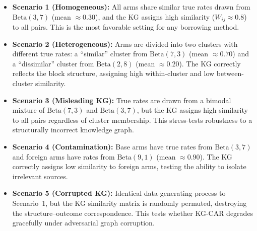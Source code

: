 \documentclass[12pt]{article}
\begin{document}
\begin{itemize}
\item \textbf{Scenario 1 (Homogeneous):} All arms share similar true rates drawn from $\text{Beta}(3, 7)$ (mean $\approx 0.30$), and the KG assigns high similarity ($W_{ij} \approx 0.8$) to all pairs. This is the most favorable setting for any borrowing method.

\item \textbf{Scenario 2 (Heterogeneous):} Arms are divided into two clusters with different true rates: a ``similar'' cluster from $\text{Beta}(7, 3)$ (mean $\approx 0.70$) and a ``dissimilar'' cluster from $\text{Beta}(2, 8)$ (mean $\approx 0.20$). The KG correctly reflects the block structure, assigning high within-cluster and low between-cluster similarity.

\item \textbf{Scenario 3 (Misleading KG):} True rates are drawn from a bimodal mixture of $\text{Beta}(7, 3)$ and $\text{Beta}(3, 7)$, but the KG assigns high similarity to all pairs regardless of cluster membership. This stress-tests robustness to a structurally incorrect knowledge graph.

\item \textbf{Scenario 4 (Contamination):} Base arms have true rates from $\text{Beta}(3, 7)$ and foreign arms have rates from $\text{Beta}(9, 1)$ (mean $\approx 0.90$). The KG correctly assigns low similarity to foreign arms, testing the ability to isolate irrelevant sources.

\item \textbf{Scenario 5 (Corrupted KG):} Identical data-generating process to Scenario~1, but the KG similarity matrix is randomly permuted, destroying the structure--outcome correspondence. This tests whether KG-CAR degrades gracefully under adversarial graph corruption.
\end{itemize}
\end{document}
